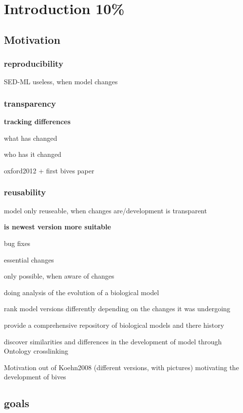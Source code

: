\section{Introduction 10\%}
\subsection{Motivation}
\subsubsection{reproducibility}

\par SED-ML useless, when model changes\subsubsection{transparency}
\par \textbf{tracking differences}

\par what has changed
\par who has it changed
\par oxford2012 + first bives paper\subsubsection{reusability}

\par model only reuseable, when changes are/development is transparent\par \textbf{is newest version more suitable}

\par bug fixes
\par essential changes
\par only possible, when aware of changes
\par doing analysis of the evolution of a biological model
\par rank model versions differently depending on the changes it was undergoing
\par provide a comprehensive repository of biological models and there history
\par discover similarities and differences in the development of model through Ontology crosslinking
\par Motivation out of Koehn2008 (different versions, with pictures) motivating the development of bives\subsection{goals}

